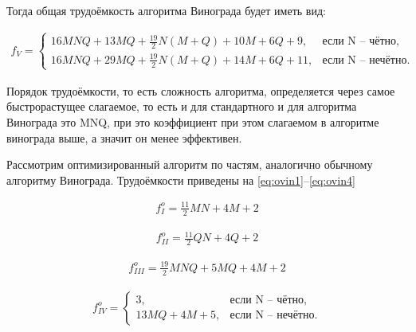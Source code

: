 Тогда общая трудоёмкость алгоритма Винограда будет иметь вид:

\begin{equation}
	\label{eq:vin}
	\begin{matrix}
		f_{V} = \begin{cases}
			16MNQ + 13MQ + \frac{19}{2}N(M+Q) + 10M + 6Q + 9, &\text{если N – чётно}, \\
			16MNQ + 29MQ + \frac{19}{2}N(M+Q) + 14M + 6Q + 11, &\text{если N – нечётно}.
		\end{cases}
	\end{matrix}
\end{equation}

Порядок трудоёмкости, то есть сложность алгоритма, определяется через самое быстрорастущее слагаемое, то есть и для стандартного и для алгоритма Винограда это MNQ, при это коэффициент при этом слагаемом в алгоритме винограда выше, а значит он менее эффективен.

Рассмотрим оптимизированный алгоритм по частям, аналогично обычному алгоритму Винограда. Трудоёмкости приведены на \ref{eq:ovin1}–\ref{eq:ovin4}

\begin{equation}
	\label{eq:ovin1}
	\begin{matrix}
		f^o_{I} = \frac{11}{2}MN + 4M + 2 
	\end{matrix}
\end{equation}

\begin{equation}
	\label{eq:ovin2}
	\begin{matrix}
		f^o_{II} = \frac{11}{2}QN + 4Q + 2 
	\end{matrix}
\end{equation}

\begin{equation}
	\label{eq:ovin3}
	\begin{matrix}
		f^o_{III} = \frac{19}{2}MNQ + 5MQ + 4M + 2
	\end{matrix}
\end{equation}

\begin{equation}
	\label{eq:ovin4}
	\begin{matrix}
		f^o_{IV} = \begin{cases}
			3, &\text{если N – чётно}, \\
			13MQ + 4M + 5, &\text{если N – нечётно}.
		\end{cases}
	\end{matrix}
\end{equation}

